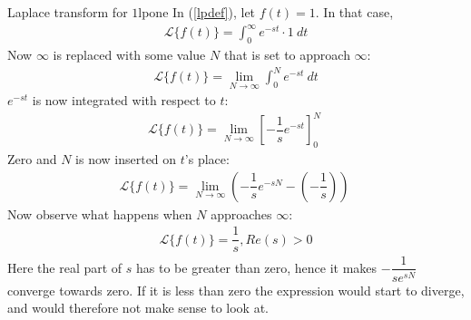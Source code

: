 \begin{example}{Laplace transform for $1$}{lpone}
In (\ref{lpdef}), let $f(t)=1$. In that case,
\begin{align*}
\mathcal{L}\{f(t)\}=\int_{0}^{\infty} e^{-st} \cdot 1\ dt
\end{align*}
Now $\infty$ is replaced with some value $N$ that is set to approach $\infty$:
\begin{align*}
\mathcal{L}\{f(t)\}= \lim_{N \to \infty}  \int_{0}^{N} e^{-st}\ dt
\end{align*}
$e^{-st}$ is now integrated with respect to $t$:
\begin{align*}
\mathcal{L}\{f(t)\}= \lim_{N \to \infty} \left[ -\dfrac{1}{s} e^{-st} \right]_{0}^{N} \ 
\end{align*}
Zero and $N$ is now inserted on $t$’s place:
\begin{align*}
\mathcal{L}\{f(t)\}= \lim_{N \to \infty} \left( -\dfrac{1}{s} e^{-sN} - \left(-\dfrac{1}{s}\right) \right) \ 
\end{align*}
Now observe what happens when $N$ approaches $\infty$:
\begin{align*}
\mathcal{L}\{f(t)\}=\dfrac{1}{s} , Re(s) > 0
\end{align*}
Here the real part of $s$ has to be greater than zero, hence it makes $-\dfrac{1}{se^{sN}}$ converge towards zero. If it is less than zero the expression would start to diverge, and would therefore not make sense to look at.
\end{example}


